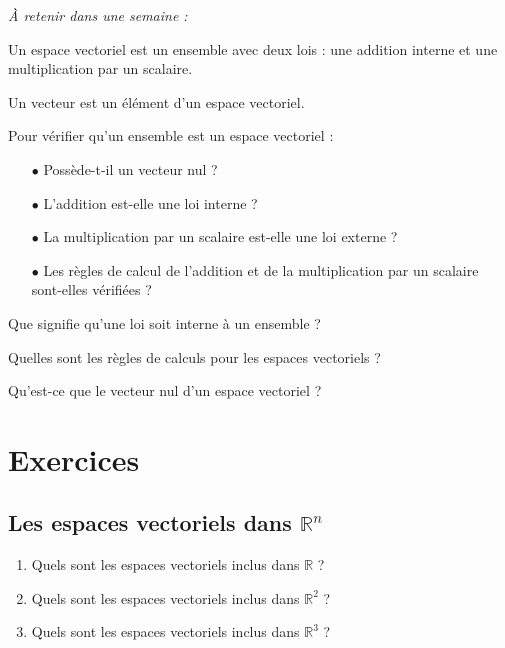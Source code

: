 
\begin{resumeBox}
  \emph{À retenir dans une semaine :} 
  \begin{niceitemize}
    \item Un espace vectoriel est un ensemble avec deux lois : une addition interne et une multiplication par un scalaire.
    \item Un vecteur est un élément d'un espace vectoriel.
    \item Pour vérifier qu'un ensemble est un espace vectoriel  :
      \begin{itemize}
        \item[$\bullet$] Possède-t-il un vecteur nul ?
        \item[$\bullet$] L'addition est-elle une loi interne ?
        \item[$\bullet$] La multiplication par un scalaire est-elle une loi externe ?
        \item[$\bullet$] Les règles de calcul de l'addition et de la multiplication par un scalaire sont-elles vérifiées ?
      \end{itemize}
  \end{niceitemize}
\end{resumeBox}

\begin{rappelsBox}
  \begin{niceitemize}
    \item Que signifie qu'une loi soit interne à un ensemble ?
    \item Quelles sont les règles de calculs pour les espaces vectoriels ?
    \item Qu'est-ce que le vecteur nul d'un espace vectoriel ?
  \end{niceitemize}
\end{rappelsBox}

\section{Exercices}
\subsection{Les espaces vectoriels dans $\mathbb{R}^n$}

\begin{enumerate}
  \item Quels sont les espaces vectoriels inclus dans $\mathbb{R}$ ?
  \item Quels sont les espaces vectoriels inclus dans $\mathbb{R}^2$ ?
  \item Quels sont les espaces vectoriels inclus dans $\mathbb{R}^3$ ?
\end{enumerate}

